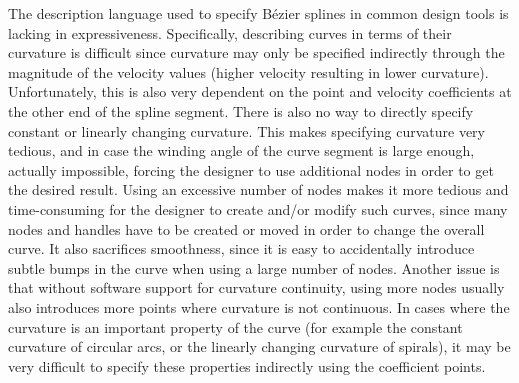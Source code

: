 \documentclass[a4paper]{article}
\begin{document}
				The description language used to specify Bézier splines in common design tools is lacking in expressiveness. Specifically, describing curves in terms of their curvature is difficult since curvature may only be specified indirectly through the magnitude of the velocity values (higher velocity resulting in lower curvature). Unfortunately, this is also very dependent on the point and velocity coefficients at the other end of the spline segment. There is also no way to directly specify constant or linearly changing curvature. This makes specifying curvature very tedious, and in case the winding angle of the curve segment is large enough, actually impossible, forcing the designer to use additional nodes in order to get the desired result. Using an excessive number of nodes makes it more tedious and time-consuming for the designer to create and/or modify such curves, since many nodes and handles have to be created or moved in order to change the overall curve. It also sacrifices smoothness, since it is easy to accidentally introduce subtle bumps in the curve when using a large number of nodes. Another issue is that without software support for curvature continuity, using more nodes usually also introduces more points where curvature is not continuous. In cases where the curvature is an important property of the curve (for example the constant curvature of circular arcs, or the linearly changing curvature of spirals), it may be very difficult to specify these properties indirectly using the coefficient points.
\end{document}
